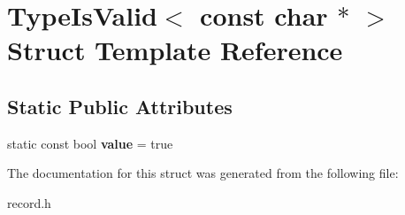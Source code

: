 \hypertarget{struct_type_is_valid_3_01const_01char_01_5_01_4}{\section{Type\-Is\-Valid$<$ const char $\ast$ $>$ Struct Template Reference}
\label{struct_type_is_valid_3_01const_01char_01_5_01_4}
}
\subsection*{Static Public Attributes}
\begin{DoxyCompactItemize}
\item 
\hypertarget{struct_type_is_valid_3_01const_01char_01_5_01_4_a223f69dcbfa69c7a5c0005bafdc538fb}{static const bool {\bfseries value} = true}\label{struct_type_is_valid_3_01const_01char_01_5_01_4_a223f69dcbfa69c7a5c0005bafdc538fb}

\end{DoxyCompactItemize}


The documentation for this struct was generated from the following file\-:\begin{DoxyCompactItemize}
\item 
record.\-h\end{DoxyCompactItemize}
